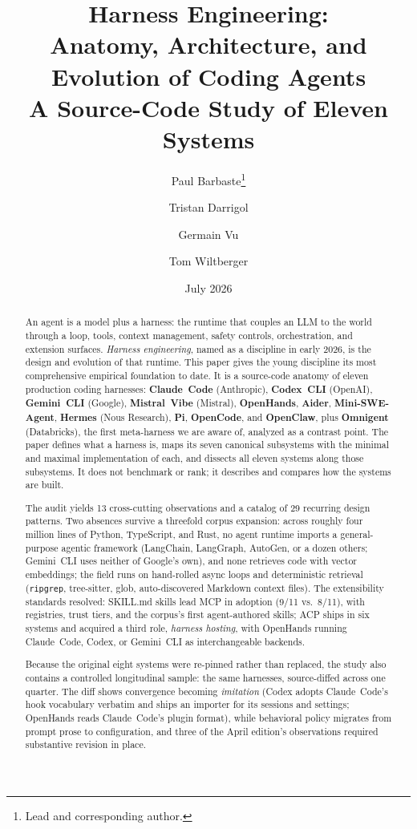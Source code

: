 \documentclass[11pt,a4paper]{article}
\title{\textbf{Harness Engineering:\\Anatomy, Architecture, and Evolution of Coding Agents}\\[0.35em]\large A Source-Code Study of Eleven Systems}
\author[1,2]{Paul Barbaste\thanks{Lead and corresponding author.}}
\author[2]{Tristan Darrigol}
\author[2]{Germain Vu}
\author[2]{Tom Wiltberger}
\affil[1]{Inclusive Brains}
\affil[2]{Wavestone AI Lab}
\date{July 2026}
\begin{document}
\maketitle

\begin{abstract}
An agent is a model plus a harness: the runtime that couples an LLM to the world through a loop, tools, context management, safety controls, orchestration, and extension surfaces.
\emph{Harness engineering}, named as a discipline in early 2026, is the design and evolution of that runtime.
This paper gives the young discipline its most comprehensive empirical foundation to date.
It is a source-code anatomy of eleven production coding harnesses: \textbf{Claude~Code} (Anthropic), \textbf{Codex~CLI} (OpenAI), \textbf{Gemini~CLI} (Google), \textbf{Mistral~Vibe} (Mistral), \textbf{OpenHands}, \textbf{Aider}, \textbf{Mini-SWE-Agent}, \textbf{Hermes} (Nous Research), \textbf{Pi}, \textbf{OpenCode}, and \textbf{OpenClaw}, plus \textbf{Omnigent} (Databricks), the first meta-harness we are aware of, analyzed as a contrast point.
The paper defines what a harness is, maps its seven canonical subsystems with the minimal and maximal implementation of each, and dissects all eleven systems along those subsystems.
It does not benchmark or rank; it describes and compares how the systems are built.

The audit yields 13 cross-cutting observations and a catalog of 29 recurring design patterns.
Two absences survive a threefold corpus expansion: across roughly four million lines of Python, TypeScript, and Rust, no agent runtime imports a general-purpose agentic framework (LangChain, LangGraph, AutoGen, or a dozen others; Gemini~CLI uses neither of Google's own), and none retrieves code with vector embeddings; the field runs on hand-rolled async loops and deterministic retrieval (\texttt{ripgrep}, tree-sitter, glob, auto-discovered Markdown context files).
The extensibility standards resolved: SKILL.md skills lead MCP in adoption (9/11 vs.\ 8/11), with registries, trust tiers, and the corpus's first agent-authored skills; ACP ships in six systems and acquired a third role, \emph{harness hosting}, with OpenHands running Claude~Code, Codex, or Gemini~CLI as interchangeable backends.

Because the original eight systems were re-pinned rather than replaced, the study also contains a controlled longitudinal sample: the same harnesses, source-diffed across one quarter.
The diff shows convergence becoming \emph{imitation} (Codex adopts Claude~Code's hook vocabulary verbatim and ships an importer for its sessions and settings; OpenHands reads Claude~Code's plugin format), while behavioral policy migrates from prompt prose to configuration, and three of the April edition's observations required substantive revision in place.


\end{abstract}
\end{document}
